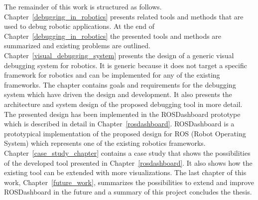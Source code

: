 
The remainder of this work is structured as follows. Chapter~\ref{debugging_in_robotics} presents related tools and methods that are used to debug robotic applications. At the end of Chapter~\ref{debugging_in_robotics} the presented tools and methods are summarized and existing problems are outlined. Chapter~\ref{visual_debugging_system} presents the design of a generic visual debugging system for robotics. It is generic because it does not target a specific framework for robotics and can be implemented for any of the existing frameworks. The chapter contains goals and requirements for the debugging system which have driven the design and development. It also presents the architecture and system design of the proposed debugging tool in more detail. The presented design has been implemented in the ROSDashboard prototype which is described in detail in Chapter~\ref{rosdashboard}. ROSDashboard is a prototypical implementation of the proposed design for ROS (Robot Operating System) which represents one of the existing robotics frameworks. Chapter~\ref{case_study_chapter} contains a case study that shows the possibilities of the developed tool presented in Chapter~\ref{rosdashboard}. It also shows how the existing tool can be extended with more visualizations. The last chapter of this work, Chapter~\ref{future_work}, summarizes the possibilities to extend and improve ROSDashboard in the future and a summary of this project concludes the thesis.
